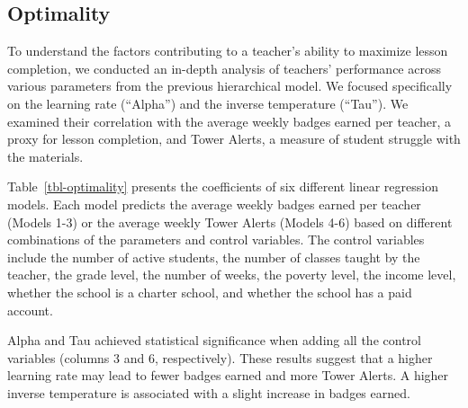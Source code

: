 \documentclass[
  number,
  preprint,
  3p,
  onecolumn]{elsarticle}
\begin{document}
\hypertarget{optimality}{%
\subsection{Optimality}\label{optimality}}

To understand the factors contributing to a teacher's ability to
maximize lesson completion, we conducted an in-depth analysis of
teachers' performance across various parameters from the previous
hierarchical model. We focused specifically on the learning rate
(``Alpha'') and the inverse temperature (``Tau''). We examined their
correlation with the average weekly badges earned per teacher, a proxy
for lesson completion, and Tower Alerts, a measure of student struggle
with the materials.

Table~\ref{tbl-optimality} presents the coefficients of six different
linear regression models. Each model predicts the average weekly badges
earned per teacher (Models 1-3) or the average weekly Tower Alerts
(Models 4-6) based on different combinations of the parameters and
control variables. The control variables include the number of active
students, the number of classes taught by the teacher, the grade level,
the number of weeks, the poverty level, the income level, whether the
school is a charter school, and whether the school has a paid account.

Alpha and Tau achieved statistical significance when adding all the
control variables (columns 3 and 6, respectively). These results suggest
that a higher learning rate may lead to fewer badges earned and more
Tower Alerts. A higher inverse temperature is associated with a slight
increase in badges earned.
\end{document}
